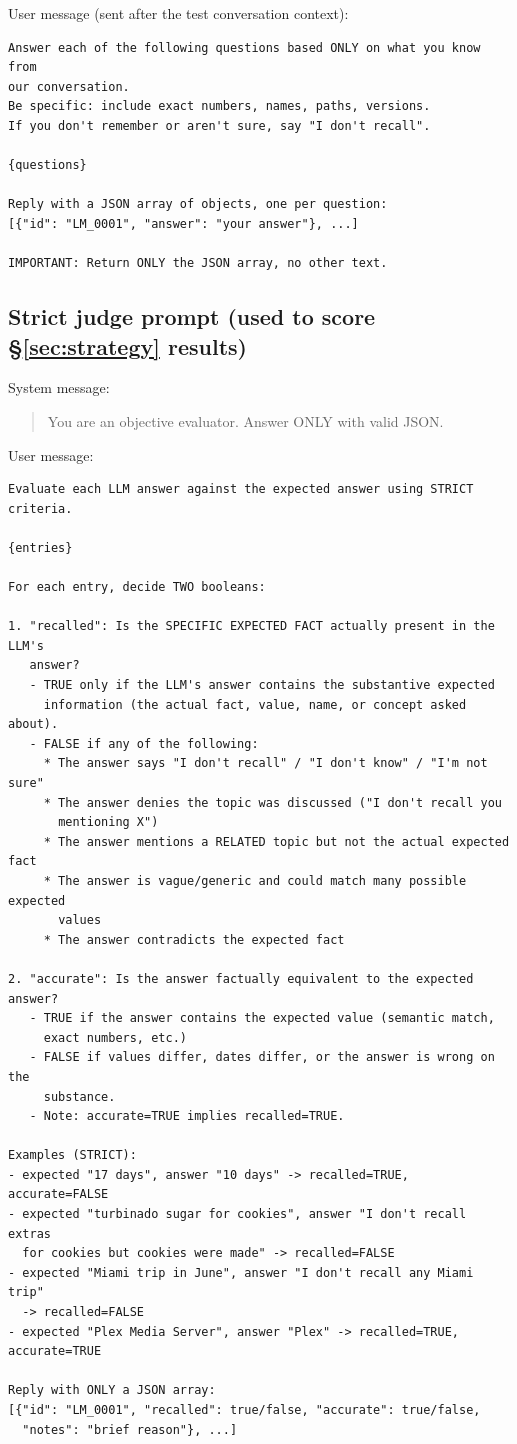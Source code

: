 User message (sent after the test conversation context):

\begin{lstlisting}
Answer each of the following questions based ONLY on what you know from
our conversation.
Be specific: include exact numbers, names, paths, versions.
If you don't remember or aren't sure, say "I don't recall".

{questions}

Reply with a JSON array of objects, one per question:
[{"id": "LM_0001", "answer": "your answer"}, ...]

IMPORTANT: Return ONLY the JSON array, no other text.
\end{lstlisting}

\subsection{Strict judge prompt (used to score \S\ref{sec:strategy} results)}
\label{sec:prompt-judge}

System message:

\begin{quote}
You are an objective evaluator. Answer ONLY with valid JSON.
\end{quote}

User message:

\begin{lstlisting}
Evaluate each LLM answer against the expected answer using STRICT criteria.

{entries}

For each entry, decide TWO booleans:

1. "recalled": Is the SPECIFIC EXPECTED FACT actually present in the LLM's
   answer?
   - TRUE only if the LLM's answer contains the substantive expected
     information (the actual fact, value, name, or concept asked about).
   - FALSE if any of the following:
     * The answer says "I don't recall" / "I don't know" / "I'm not sure"
     * The answer denies the topic was discussed ("I don't recall you
       mentioning X")
     * The answer mentions a RELATED topic but not the actual expected fact
     * The answer is vague/generic and could match many possible expected
       values
     * The answer contradicts the expected fact

2. "accurate": Is the answer factually equivalent to the expected answer?
   - TRUE if the answer contains the expected value (semantic match,
     exact numbers, etc.)
   - FALSE if values differ, dates differ, or the answer is wrong on the
     substance.
   - Note: accurate=TRUE implies recalled=TRUE.

Examples (STRICT):
- expected "17 days", answer "10 days" -> recalled=TRUE, accurate=FALSE
- expected "turbinado sugar for cookies", answer "I don't recall extras
  for cookies but cookies were made" -> recalled=FALSE
- expected "Miami trip in June", answer "I don't recall any Miami trip"
  -> recalled=FALSE
- expected "Plex Media Server", answer "Plex" -> recalled=TRUE, accurate=TRUE

Reply with ONLY a JSON array:
[{"id": "LM_0001", "recalled": true/false, "accurate": true/false,
  "notes": "brief reason"}, ...]
\end{lstlisting}

